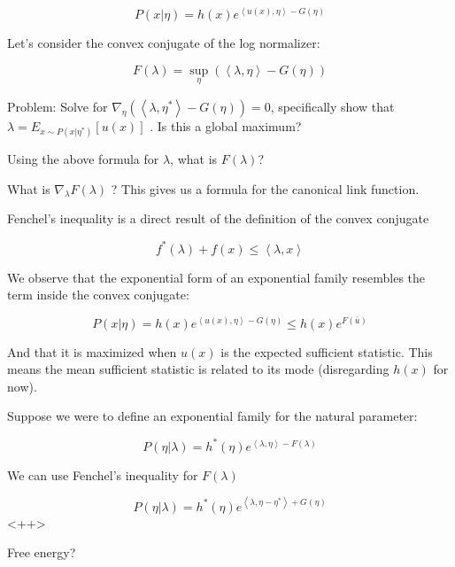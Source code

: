 \documentclass[a4paper]{article}
\begin{document}
\begin{equation}
  P( x \vert \eta) = h(x) e^{ \left< u(x), \eta \right> - G(\eta) }
  \label{}
\end{equation}

Let's consider the convex conjugate of the log normalizer:

\begin{equation}
  F( \lambda ) = \sup_\eta \left( \left< \lambda, \eta \right> - G(\eta) \right)
  \label{}
\end{equation}

Problem:  
Solve for $ \nabla_\eta \left( \left< \lambda, \eta^* \right> - G(\eta) \right) = 0 $, specifically show that $ \lambda = E_{ x \sim P( x \vert \eta^*) } \left[ u(x) \right] $ .  Is this a global maximum?  

Using the above formula for $\lambda$, what is $F(\lambda)$?  

What is $\nabla_\lambda F(\lambda)$ ?  This gives us a formula for the canonical link function.

Fenchel's inequality is a direct result of the definition of the convex conjugate

\begin{equation}
  f^*( \lambda) + f(x) \leq \left< \lambda, x \right>
  \label{Fenchel's inequality}
\end{equation}

We observe that the exponential form of an exponential family resembles the term inside the convex conjugate:

\begin{equation}
  P( x \vert \eta) = h(x) e^{ \left< u(x), \eta \right> - G(\eta) } \leq h(x) e^{ F( \bar{u} ) }
  \label{}
\end{equation}

And that it is maximized when $u(x)$ is the expected sufficient statistic.  This means the mean sufficient statistic is related to its mode (disregarding $h(x)$ for now).  

Suppose we were to define an exponential family for the natural parameter:

\begin{equation}
  P( \eta \vert \lambda ) = h^*(\eta) e^{ \left< \lambda, \eta \right> - F(\lambda) }
  \label{}
\end{equation}

We can use Fenchel's inequality for $F(\lambda)$

\begin{equation}
  P( \eta \vert \lambda ) = h^*(\eta) e^{ \left< \lambda, \eta - \eta^* \right> + G(\eta) }
  \label{<++>}
\end{equation}<++>



Free energy?
\end{document}
